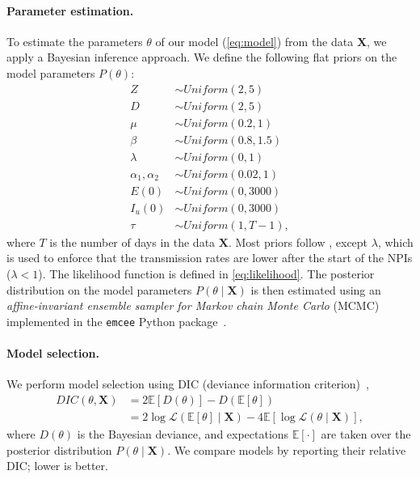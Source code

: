 \documentclass[12pt]{extarticle}
\let\vec\mathbf
\begin{document}
\paragraph*{Parameter estimation.}
To estimate the parameters $\theta$ of our model (\autoref{eq:model}) from the data $\vec{X}$, we apply a Bayesian inference approach.
We define the following flat priors on the model parameters $P(\theta)$:
\begin{equation} \label{eq:priors}
\begin{aligned} %
Z & \sim \mathit{Uniform}(2, 5) \\
D & \sim \mathit{Uniform}(2, 5) \\
\mu & \sim \mathit{Uniform}(0.2, 1) \\
\beta & \sim \mathit{Uniform}(0.8, 1.5) \\
\lambda & \sim \mathit{Uniform}(0, 1) \\
\alpha_1, \alpha_2 & \sim \mathit{Uniform}(0.02, 1)\\
E(0) & \sim \mathit{Uniform}(0, 3000) \\
I_u(0) & \sim \mathit{Uniform}(0, 3000) \\
\tau &\sim \mathit{Uniform}(1, T-1),
\end{aligned}
\end{equation}
where $T$ is the number of days in the data $\vec{X}$.
Most priors follow \citet{Li2020}, except $\lambda$, which is used to enforce that the transmission rates are lower after the start of the NPIs ($\lambda < 1$).
The likelihood function is defined in \autoref{eq:likelihood}.
The posterior distribution on the model parameters $P(\theta \mid \vec{X})$ is then estimated using an \textit{affine-invariant ensemble sampler for Markov chain Monte Carlo} (MCMC) implemented in the \texttt{emcee} Python package~\citep{Foreman-Mackey2013}.


\paragraph*{Model selection.}
We perform model selection using DIC (deviance information criterion)~\citep{Spiegelhalter2002},
\begin{equation} \label{eq:DIC}
\begin{aligned}
DIC(\theta, \vec{X}) &= 2\mathbb{E}[D(\theta)] - D(\mathbb{E}[\theta])   \\
&= 2 \log\mathcal{L}(\mathbb{E}[\theta] \mid \vec{X}) - 4\mathbb{E}[\log\mathcal{L}(\theta \mid \vec{X})],
\end{aligned}
\end{equation}
where $D(\theta)$ is the Bayesian deviance, and expectations $\mathbb{E}[\cdot]$ are taken over the posterior distribution $P(\theta \mid \vec{X})$.
We compare models by reporting their relative DIC; lower is better.
\end{document}
